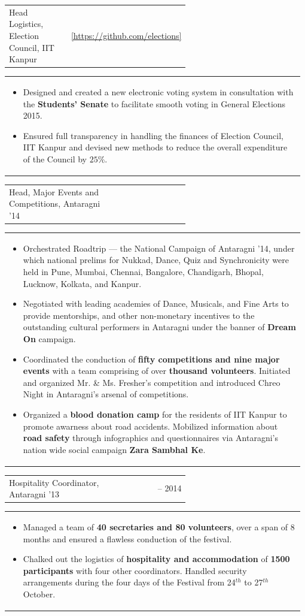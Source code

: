 \documentclass[a4paper]{article} %
\newcommand{\verticalspacing}{-0.25cm}
\newcommand{\headspace}{-0.3cm}
\newcommand{\gitproject}[3]{
    \begin{tabular}{p{0.60\linewidth}r}
        \textcolor{NavyBlue}{\small #2} & \multicolumn{1}{m{7.3cm}}{\raggedleft #1}\\
    \end{tabular}
    \begin{tabular}{p{0.98\linewidth}}
        \vspace{\headspace{}}
        \small{#3}
    \end{tabular}
    \vspace{\verticalspacing{}}
    \vspace{-0.2cm} %
}
\begin{document}
\gitproject
    {\href{https://github.com/srijanshetty/elections} {\small{[https://github.com/elections]}}}
    {Head Logistics, Election Council, IIT Kanpur}
    {
        \begin{itemize}[leftmargin=0.5cm]
            \item Designed and created a new electronic voting system in consultation with the \textbf{Students' Senate}
                to facilitate smooth voting in General Elections 2015.
            \item Ensured full transparency in handling the finances of Election Council, IIT Kanpur and devised new methods
                to reduce the overall expenditure of the Council by $25\%$.
        \end{itemize}
    }

\gitproject
    {2014}
    {Head, Major Events and Competitions, Antaragni '14}
    {
        \begin{itemize}[leftmargin=0.5cm]
            \item Orchestrated Roadtrip --- the National Campaign of Antaragni '14, under which national
                prelims for Nukkad, Dance, Quiz and Synchronicity were held in Pune, Mumbai, Chennai,
                Bangalore, Chandigarh, Bhopal, Lucknow, Kolkata, and Kanpur.
            \item Negotiated with leading academies of Dance, Musicals, and Fine Arts to provide mentorships,
                and other non-monetary incentives to the outstanding cultural performers in Antaragni
                under the banner of \textbf{Dream On} campaign.
            \item Coordinated the conduction of \textbf{fifty competitions and nine major events} with a team
                comprising of over \textbf{thousand volunteers}.  Initiated and organized Mr. \& Ms. Fresher's
                competition and introduced Chreo Night in Antaragni's arsenal of competitions.
            \item Organized a \textbf{blood donation camp} for the residents of IIT Kanpur to promote awarness
                about road accidents.  Mobilized information about \textbf{road safety} through infographics
                and questionnaires via Antaragni's nation wide social campaign \textbf{Zara Sambhal Ke}.
        \end{itemize}
    }

\gitproject
    {2013 -- 2014}
    {Hospitality Coordinator, Antaragni '13}
    {
        \begin{itemize}[leftmargin=0.5cm]
            \item Managed a team of \textbf{40 secretaries and 80 volunteers}, over a span of 8 months and ensured a
                flawless conduction of the festival.
            \item Chalked out the logistics of \textbf{hospitality and accommodation} of \textbf{1500 participants}
                with four other coordinators.  Handled security arrangements during the four days of the
                Festival from 24$^{th}$ to 27$^{th}$ October.
        \end{itemize}
    }
\end{document}

